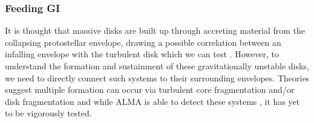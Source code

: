\documentclass[preprint,12pt]{aastex62}
\begin{document}
\subsubsection*{Feeding GI}
It is thought that massive disks are built up through accreting material from the collapsing protostellar envelope, drawing a possible correlation between an infalling envelope with the turbulent disk which we can test \citep[e.g.][]{2010ApJ...708.1585K,2010ApJ...725.1485O}. However, to understand the formation and sustainment of these gravitationally unstable disks, we need to directly connect such systems to their surrounding envelopes. Theories suggest multiple formation can occur via turbulent core fragmentation \citep[e.g.][]{2018ApJ...856..147O} and/or disk fragmentation \citep{2010ApJ...710.1375K} and while ALMA is able to detect these systems \citep[see][]{2012MNRAS.420L..53O}, it has yet to be vigorously tested.

\end{document}
